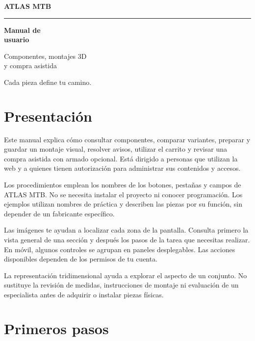 \documentclass[12pt,letterpaper]{article}
\begin{document}
\begin{titlepage}
\thispagestyle{empty}
\begingroup\singlespacing\sffamily\raggedright\color{ManualInk}
\vspace*{1.5cm}
{\Large\bfseries ATLAS MTB\par}
\vspace{1.3cm}
{\color{ManualAccent}\rule{2cm}{2pt}\par}
\vspace{0.7cm}
{\fontsize{36}{42}\selectfont\bfseries Manual de\\usuario\par}
\vspace{1cm}
{\Large Componentes, montajes 3D\\y compra asistida\par}
\vfill
{\large Cada pieza define tu camino.\par}
\vspace{1cm}
\endgroup
\end{titlepage}
\setcounter{page}{2}
\section*{Presentación}
Este manual explica cómo consultar componentes, comparar variantes, preparar y guardar un montaje visual, resolver avisos, utilizar el carrito y revisar una compra asistida con armado opcional. Está dirigido a personas que utilizan la web y a quienes tienen autorización para administrar sus contenidos y accesos.

Los procedimientos emplean los nombres de los botones, pestañas y campos de ATLAS MTB. No se necesita instalar el proyecto ni conocer programación. Los ejemplos utilizan nombres de práctica y describen las piezas por su función, sin depender de un fabricante específico.

Las imágenes te ayudan a localizar cada zona de la pantalla. Consulta primero la vista general de una sección y después los pasos de la tarea que necesitas realizar. En móvil, algunos controles se agrupan en paneles desplegables. Las acciones disponibles dependen de los permisos de tu cuenta.

La representación tridimensional ayuda a explorar el aspecto de un conjunto. No sustituye la revisión de medidas, instrucciones de montaje ni evaluación de un especialista antes de adquirir o instalar piezas físicas.
\clearpage\tableofcontents
\clearpage\listoffigures\listoftables
\clearpage
\section{Primeros pasos}
\end{document}
